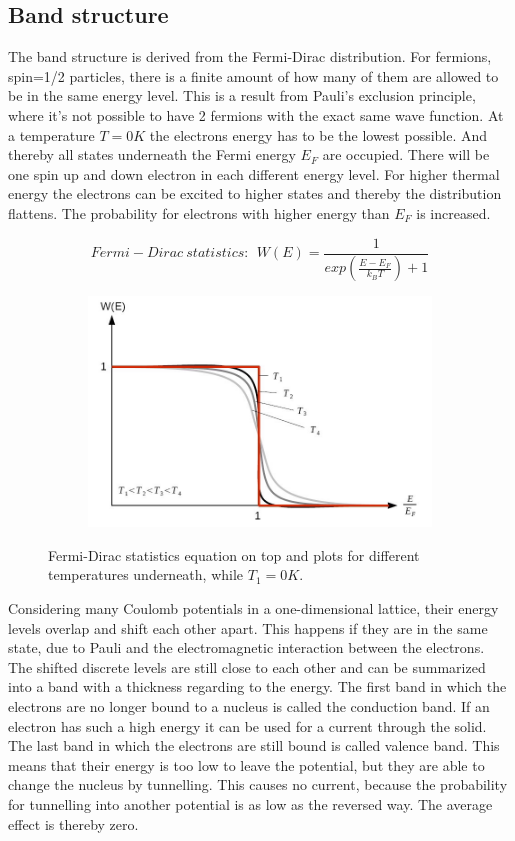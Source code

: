 \documentclass[]{article}
\begin{document}
\subsection{Band structure}
  The band structure is derived from the Fermi-Dirac distribution. For fermions, spin=1/2 particles, there is a finite amount of how many of them are allowed to be in the same energy level. This is a result from Pauli's exclusion principle, where it's not possible to have 2 fermions with the exact same wave function. At a temperature $T=0K$ the electrons energy has to be the lowest possible. And thereby all states underneath the Fermi energy $E_F$ are occupied. There will be one spin up and down electron in each different energy level. For higher thermal energy the electrons can be excited to higher states and thereby the distribution flattens. The probability for electrons with higher energy than $E_F$ is increased.

\begin{figure}[H]
\centering
\begin{subfigure}[b]{1\textwidth}
	\centering
	\begin{equation}
	Fermi-Dirac \ statistics: \:\: W(E) = \frac{1}{exp\left(\frac{E-E_F}{k_B T}\right)+1} 
	\end{equation}
\end{subfigure}
\begin{subfigure}[b]{1\textwidth}
	\centering
	\includegraphics[width=.7\textwidth]{Plots/fd.png}
\end{subfigure}
\caption{Fermi-Dirac statistics equation on top and plots for different temperatures underneath, while $T_1=0K$. \cite{wiki}}
\end{figure}

Considering many Coulomb potentials in a one-dimensional lattice, their energy levels overlap and shift each other apart. This happens if they are in the same state, due to Pauli and the electromagnetic interaction between the electrons. The shifted discrete levels are still close to each other and can be summarized into a band with a thickness regarding to the energy. The first band in which the electrons are no longer bound to a nucleus is called the conduction band. If an electron has such a high energy it can be used for a current through the solid. The last band in which the electrons are still bound is called valence band. This means that their energy is too low to leave the potential, but they are able to change the nucleus by tunnelling. This causes no current, because the probability for tunnelling into another potential is as low as the reversed way. The average effect is thereby zero.
\end{document}
